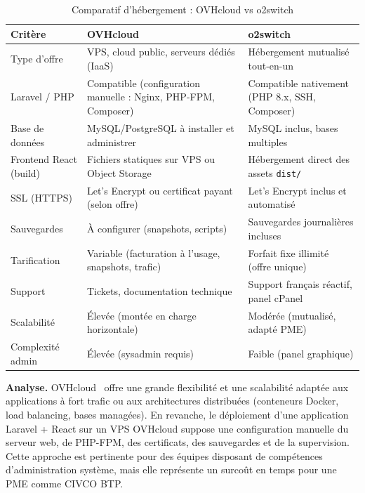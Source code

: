 \begin{table}[H]
\caption{Comparatif d'hébergement : OVHcloud vs o2switch}
\label{tab:hebergement}
\centering
\small
\begin{tabular}{|p{3.2cm}|p{5.2cm}|p{5.2cm}|}
\hline
\textbf{Critère} & \textbf{OVHcloud} & \textbf{o2switch} \\
\hline
Type d'offre & VPS, cloud public, serveurs dédiés (IaaS) & Hébergement mutualisé
tout-en-un \\
\hline
Laravel / PHP & Compatible (configuration manuelle : Nginx, PHP-FPM, Composer) &
Compatible nativement (PHP 8.x, SSH, Composer) \\
\hline
Base de données & MySQL/PostgreSQL à installer et administrer & MySQL inclus,
bases multiples \\
\hline
Frontend React (build) & Fichiers statiques sur VPS ou Object Storage & Hébergement
direct des assets \texttt{dist/} \\
\hline
SSL (HTTPS) & Let's Encrypt ou certificat payant (selon offre) & Let's Encrypt
inclus et automatisé \\
\hline
Sauvegardes & À configurer (snapshots, scripts) & Sauvegardes journalières incluses \\
\hline
Tarification & Variable (facturation à l'usage, snapshots, trafic) & Forfait fixe
illimité (offre unique) \\
\hline
Support & Tickets, documentation technique & Support français réactif, panel cPanel \\
\hline
Scalabilité & Élevée (montée en charge horizontale) & Modérée (mutualisé, adapté PME) \\
\hline
Complexité admin & Élevée (sysadmin requis) & Faible (panel graphique) \\
\hline
\end{tabular}
\end{table}

\medskip

\textbf{Analyse.} OVHcloud~\cite{ovhcloud} offre une grande flexibilité et une
scalabilité adaptée aux applications à fort trafic ou aux architectures distribuées
(conteneurs Docker, load balancing, bases managées). En revanche, le déploiement d'une
application Laravel + React sur un VPS OVHcloud suppose une configuration manuelle
du serveur web, de PHP-FPM, des certificats, des sauvegardes et de la supervision.
Cette approche est pertinente pour des équipes disposant de compétences
d'administration système, mais elle représente un surcoût en temps pour une PME comme
CIVCO BTP.

